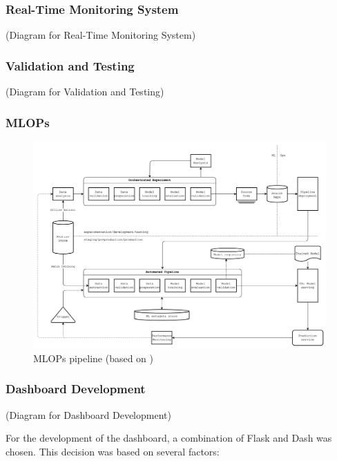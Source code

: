 \subsubsection{Real-Time Monitoring System}
(Diagram for Real-Time Monitoring System)

\subsubsection{Validation and Testing}
(Diagram for Validation and Testing)

\subsubsection{MLOPs}
\begin{figure}[H]
    \centering
    \includegraphics[width=\textwidth]{figures/methodology/mlops.png}
    \caption{MLOPs pipeline (based on \cite{kazmierczakMLOpsContinuousDelivery2024})}
    \label{fig:mlops}
\end{figure}

\subsubsection{Dashboard Development}
(Diagram for Dashboard Development)

For the development of the dashboard, a combination of Flask and Dash was chosen. This decision was based on several factors:

